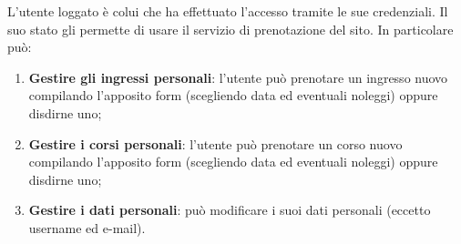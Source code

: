 L'utente loggato è colui che ha effettuato l'accesso tramite le sue credenziali. Il suo stato gli permette di usare il servizio di prenotazione
del sito. In particolare può:
\begin{enumerate}
    \item \textbf{Gestire gli ingressi personali}: l'utente può prenotare un ingresso nuovo compilando l'apposito form (scegliendo data ed
    eventuali noleggi) oppure disdirne uno;
    \item \textbf{Gestire i corsi personali}: l'utente può prenotare un corso nuovo compilando l'apposito form (scegliendo data ed
    eventuali noleggi) oppure disdirne uno;
    \item \textbf{Gestire i dati personali}: può modificare i suoi dati personali (eccetto username ed e-mail).
\end{enumerate}
